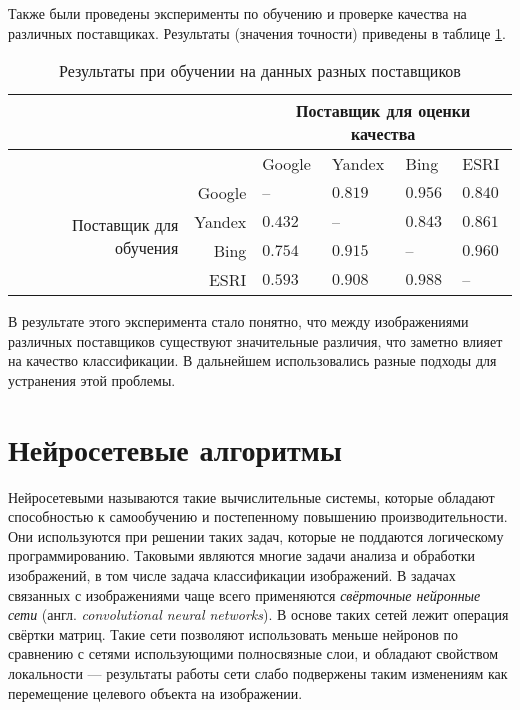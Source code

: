 Также были проведены эксперименты по обучению и проверке качества на различных
поставщиках. Результаты (значения точности) приведены в таблице
\ref{table:providers_comparison}.

\begin{table}[ht]
\caption{Результаты при обучении на данных разных поставщиков}
\label{table:providers_comparison}
\small
\begin{tabular}{|r|r|m{22mm}m{22mm}m{22mm}m{22mm}|}
    \hline
         &        & \multicolumn{4}{|c|}{Поставщик для оценки качества}\\
    \hline
         &        & Google  & Yandex  & Bing    & ESRI\\
    \hline
    \multirow{4}{24mm}{Поставщик для обучения}
         & Google & --      & $0.819$ & $0.956$ & $0.840$\\
         & Yandex & $0.432$ & --      & $0.843$ & $0.861$\\
         & Bing   & $0.754$ & $0.915$ & --      & $0.960$\\
         & ESRI   & $0.593$ & $0.908$ & $0.988$ & --\\
    \hline
\end{tabular}
\end{table}

В результате этого эксперимента стало понятно, что между изображениями различных
поставщиков существуют значительные различия, что заметно влияет на качество
классификации. В дальнейшем использовались разные подходы для устранения этой
проблемы.


\section{Нейросетевые алгоритмы}
Нейросетевыми называются такие вычислительные системы, которые обладают
способностью к самообучению и постепенному повышению производительности. Они
используются при решении таких задач, которые не поддаются логическому
программированию. Таковыми являются многие задачи анализа и обработки
изображений, в том числе задача классификации изображений.
В задачах связанных с изображениями чаще всего применяются \textit{свёрточные
нейронные сети} (англ. \textit{convolutional neural networks}). В основе таких
сетей лежит операция свёртки матриц. Такие сети позволяют использовать меньше
нейронов по сравнению с сетями использующими полносвязные слои, и обладают
свойством локальности --- результаты работы сети слабо подвержены таким
изменениям как перемещение целевого объекта на изображении.

